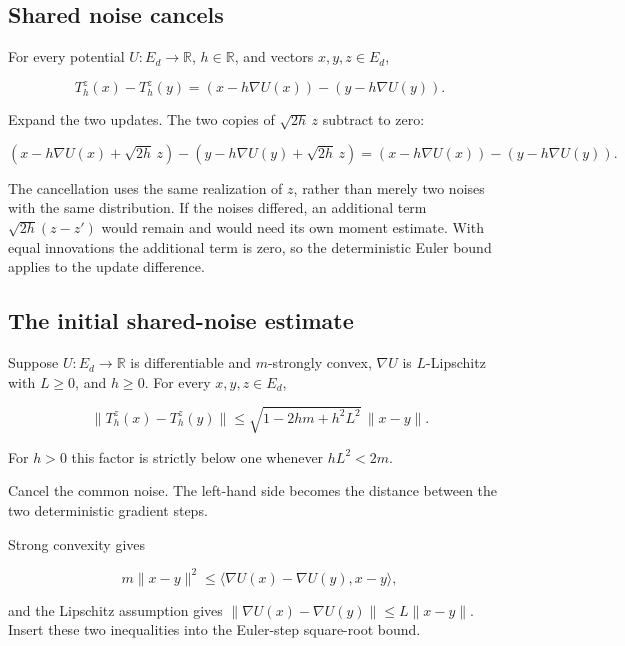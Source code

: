 \documentclass[11pt,a4paper]{report}
\begin{document}
\subsection{\texorpdfstring{Shared noise cancels}{Shared noise cancels}}
\label{report-step-UnadjustedLangevin-ULAStep-lean-3}


For every potential \(U:E_d\to\mathbb R\), \(h\in\mathbb R\), and vectors \(x,y,z\in E_d\),

\[T_h^z(x)-T_h^z(y)=(x-h\nabla U(x))-(y-h\nabla U(y)).\]

Expand the two updates. The two copies of \(\sqrt{2h}\,z\) subtract to zero:

\[(x-h\nabla U(x)+\sqrt{2h}\,z)-(y-h\nabla U(y)+\sqrt{2h}\,z)=(x-h\nabla U(x))-(y-h\nabla U(y)).\]

The cancellation uses the same realization of \(z\), rather than merely two noises with the same distribution. If the noises differed, an additional term \(\sqrt{2h}(z-z')\) would remain and would need its own moment estimate. With equal innovations the additional term is zero, so the deterministic Euler bound applies to the update difference.

\subsection{\texorpdfstring{The initial shared-noise estimate}{The initial shared-noise estimate}}
\label{report-step-UnadjustedLangevin-ULAStep-lean-4}


Suppose \(U:E_d\to\mathbb R\) is differentiable and \(m\)-strongly convex, \(\nabla U\) is \(L\)-Lipschitz with \(L\ge0\), and \(h\ge0\). For every \(x,y,z\in E_d\),

\[\|T_h^z(x)-T_h^z(y)\|\le\sqrt{1-2hm+h^2L^2}\,\|x-y\|.\]

For \(h>0\) this factor is strictly below one whenever \(hL^2<2m\).



Cancel the common noise. The left-hand side becomes the distance between the two deterministic gradient steps.



Strong convexity gives

\[m\|x-y\|^2\le\langle\nabla U(x)-\nabla U(y),x-y\rangle,\]

and the Lipschitz assumption gives \(\|\nabla U(x)-\nabla U(y)\|\le L\|x-y\|\). Insert these two inequalities into the Euler-step square-root bound.
\end{document}
